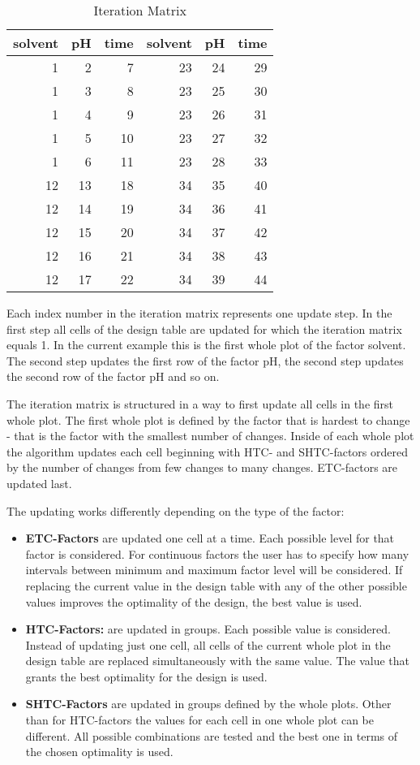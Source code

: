 \begin{table}[!h]
\centering
\begin{tabular}{rrr|rrr}
  \hline
solvent & pH & time & solvent & pH & time \\ 
  \hline
  \hline
1 & 2 & 7 & 23 & 24 & 29 \\ 
1 & 3 & 8 & 23 & 25 & 30 \\ 
1 & 4 & 9 & 23 & 26 & 31 \\ 
1 & 5 & 10 & 23 & 27 & 32 \\ 
1 & 6 & 11 & 23 & 28 & 33 \\ 
12 & 13 & 18 & 34 & 35 & 40 \\ 
12 & 14 & 19 & 34 & 36 & 41 \\ 
12 & 15 & 20 & 34 & 37 & 42 \\ 
12 & 16 & 21 & 34 & 38 & 43 \\ 
12 & 17 & 22 & 34 & 39 & 44 \\ 
   \hline
\end{tabular}
\caption{Iteration Matrix}
\label{iterationmatrix}
\end{table}


Each index number in the iteration matrix represents one update step. In the first step all cells of the design table are updated for which the iteration matrix equals 1. In the current example this is the first whole plot of the factor solvent. The second step updates the first row of the factor pH, the second step updates the second row of the factor pH and so on.

The iteration matrix is structured in a way to first update all cells in the first whole plot. The first whole plot is defined by the factor that is hardest to change - that is the factor with the smallest number of changes. Inside of each whole plot the algorithm updates each cell beginning with HTC- and SHTC-factors ordered by the number of changes from few changes to many changes. ETC-factors are updated last.

The updating works differently depending on the type of the factor:

\begin{itemize}
	\item \textbf{ETC-Factors} are updated one cell at a time. Each possible level for that factor is considered. For continuous factors the user has to specify how many intervals between minimum and maximum factor level will be considered. If replacing the current value in the design table with any of the other possible values improves the optimality of the design, the best value is used. 
	\item \textbf{HTC-Factors:} are updated in groups. Each possible value is considered. Instead of updating just one cell, all cells of the current whole plot in the design table are replaced simultaneously with the same value. The value that grants the best optimality for the design is used.
\item \textbf{SHTC-Factors} are updated in groups defined by the whole plots. Other than for HTC-factors the values for each cell in one whole plot can be different. All possible combinations are tested and the best one in terms of the chosen optimality is used.
\end{itemize}

